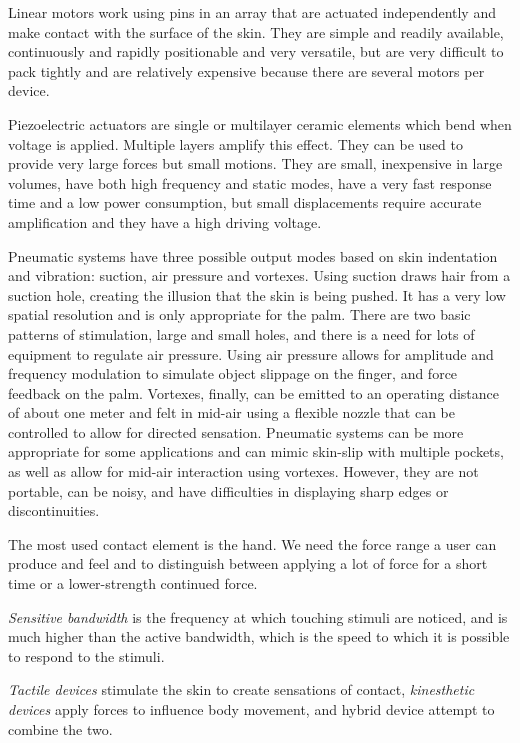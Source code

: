 \documentclass[a4paper]{article}
\begin{document}
Linear motors work using pins in an array that are actuated independently and make contact with the surface of the skin.
They are simple and readily available, continuously and rapidly positionable and very versatile, but are very difficult to pack tightly and are relatively expensive because there are several motors per device.

Piezoelectric actuators are single or multilayer ceramic elements which bend when voltage is applied.
Multiple layers amplify this effect.
They can be used to provide very large forces but small motions.
They are small, inexpensive in large volumes, have both high frequency and static modes, have a very fast response time and a low power consumption, but small displacements require accurate amplification and they have a high driving voltage.

Pneumatic systems have three possible output modes based on skin indentation and vibration: suction, air pressure and vortexes.
Using suction draws hair from a suction hole, creating the illusion that the skin is being pushed.
It has a very low spatial resolution and is only appropriate for the palm.
There are two basic patterns of stimulation, large and small holes, and there is a need for lots of equipment to regulate air pressure.
Using air pressure allows for amplitude and frequency modulation to simulate object slippage on the finger, and force feedback on the palm.
Vortexes, finally, can be emitted to an operating distance of about one meter and felt in mid-air using a flexible nozzle that can be controlled to allow for directed sensation.
Pneumatic systems can be more appropriate for some applications and can mimic skin-slip with multiple pockets, as well as allow for mid-air interaction using vortexes.
However, they are not portable, can be noisy, and have difficulties in displaying sharp edges or discontinuities.

The most used contact element is the hand. We need the force range a user can produce and feel and to distinguish between applying a lot of force for a short time or a lower-strength continued force.

\emph{Sensitive bandwidth} is the frequency at which touching stimuli are noticed, and is much higher than the active bandwidth, which is the speed to which it is possible to respond to the stimuli.

\emph{Tactile devices} stimulate the skin to create sensations of contact, \emph{kinesthetic devices} apply forces to influence body movement, and hybrid device attempt to combine the two.
\end{document}
